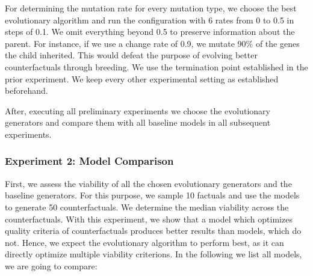 \documentclass[./../../paper.tex]{subfiles}
\begin{document}

For determining the mutation rate for every mutation type, we choose the best evolutionary algorithm and run the configuration with 6 rates from 0 to 0.5 in steps of 0.1. We omit everything beyond 0.5 to preserve information about the parent. For instance, if we use a change rate of 0.9, we mutate 90\% of the genes the child inherited. This would defeat the purpose of evolving better counterfactuals through breeding. We use the termination point established in the prior experiment. We keep every other experimental setting as established beforehand. 

After, executing all preliminary experiments we choose the evolutionary generators and compare them with all baseline models in all subsequent experiments.






\subsubsection{Experiment 2: Model Comparison}
First, we assess the viability of all the chosen evolutionary generators and the baseline generators. For this purpose, we sample 10 factuals and use the models to generate 50 counterfactuals. We determine the median viability across the counterfactuals. With this experiment, we show that a model which optimizes quality criteria of counterfactuals produces better results than models, which do not. Hence, we expect the evolutionary algorithm to perform best, as it can directly optimize multiple viability criterions. In the following we list all models, we are going to compare:

\end{document}
